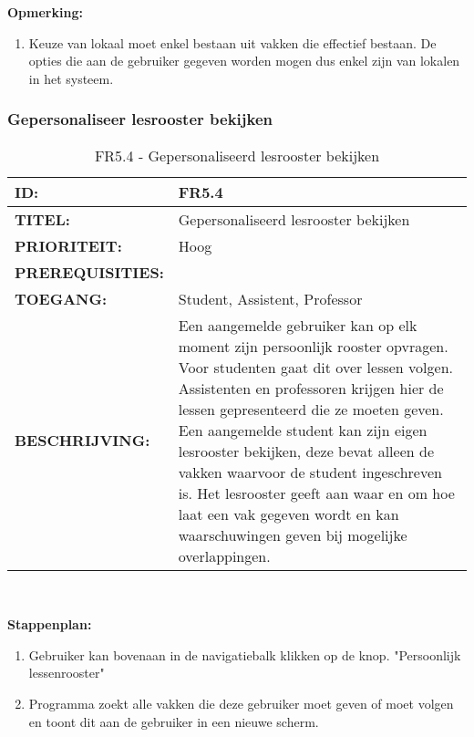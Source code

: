 \textbf{Opmerking:}
	\begin{enumerate}
	\item Keuze van lokaal moet enkel bestaan uit vakken die effectief bestaan. De opties die aan de gebruiker gegeven worden mogen dus enkel zijn van lokalen in het systeem.
	\end{enumerate}  

\subsubsection{Gepersonaliseer lesrooster bekijken}
\noindent\begin{table}[H]
            \begin{tabular}{l | p{10cm}}
                \textbf{ID:} & FR5.4 \\ \hline
                \textbf{TITEL:} & Gepersonaliseerd lesrooster bekijken\\ \hline
                \textbf{PRIORITEIT:} &  Hoog \\ \hline
                \textbf{PREREQUISITIES:} & \\ \hline
                \textbf{TOEGANG:} &  Student, Assistent, Professor \\ \hline
                \textbf{BESCHRIJVING:} & Een aangemelde gebruiker kan op elk moment zijn persoonlijk rooster opvragen. Voor studenten gaat dit over lessen volgen. Assistenten en professoren krijgen hier de lessen gepresenteerd die ze moeten geven. Een aangemelde student kan zijn eigen lesrooster bekijken, deze bevat alleen de vakken waarvoor de student ingeschreven is. 
                                        Het lesrooster geeft aan waar en om hoe laat een vak gegeven wordt en kan waarschuwingen geven bij mogelijke overlappingen.\\ 
            \end{tabular}\\
            \caption{FR5.4  - Gepersonaliseerd lesrooster bekijken}
            \label{tab:FR5.4 - Gepersonaliseerd lesrooster bekijken}
        \end{table}

\textbf{Stappenplan:}
	\begin{enumerate}
	\item Gebruiker kan bovenaan in de navigatiebalk klikken op de knop. "Persoonlijk lessenrooster"
	\item Programma zoekt alle vakken die deze gebruiker moet geven of moet volgen en toont dit aan de gebruiker in een nieuwe scherm.
	\end{enumerate}



